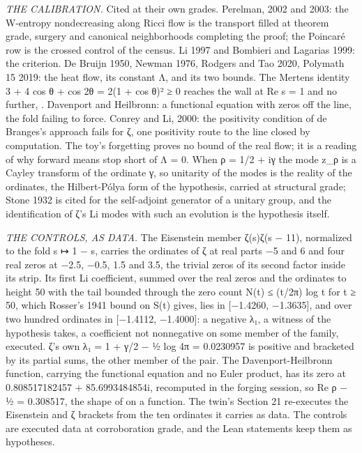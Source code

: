 \documentclass[10pt,twocolumn]{article}
\begin{document}
\emph{THE CALIBRATION.} Cited at their own grades. Perelman, 2002 and
2003: the W-entropy nondecreasing along Ricci flow is the transport
filled at theorem grade, surgery and canonical neighborhoods completing
the proof; the Poincaré row is the crossed control of the census. Li
1997 and Bombieri and Lagarias 1999: the criterion. De Bruijn 1950,
Newman 1976, Rodgers and Tao 2020, Polymath 15 2019: the heat flow, its
constant Λ, and its two bounds. The Mertens identity 3 + 4 cos θ + cos
2θ = 2(1 + cos θ)² ≥ 0 reaches the wall at Re s = 1 and no further,
\texttt{}. Davenport and Heilbronn: a
functional equation with zeros off the line, the fold failing to force.
Conrey and Li, 2000: the positivity condition of de Branges's approach
fails for ζ, one positivity route to the line closed by computation. The
toy's forgetting proves no bound of the real flow; it is a reading of
why forward means stop short of Λ = 0. When ρ = 1/2 + iγ the mode z\_ρ
is a Cayley transform of the ordinate γ, so unitarity of the modes is
the reality of the ordinates, the Hilbert-Pólya form of the hypothesis,
carried at structural grade; Stone 1932 is cited for the self-adjoint
generator of a unitary group, and the identification of ζ's Li modes
with such an evolution is the hypothesis itself.

\emph{THE CONTROLS, AS DATA.} The Eisenstein member ζ(s)ζ(s − 11),
normalized to the fold s ↦ 1 − s, carries the ordinates of ζ at real
parts −5 and 6 and four real zeros at −2.5, −0.5, 1.5 and 3.5, the
trivial zeros of its second factor inside its strip. Its first Li
coefficient, summed over the real zeros and the ordinates to height 50
with the tail bounded through the zero count N(t) ≤ (t/2π) log t for t ≥
50, which Rosser's 1941 bound on S(t) gives, lies in {[}−1.4260,
−1.3635{]}, and over two hundred ordinates in {[}−1.4112, −1.4000{]}: a
negative λ₁, a witness of the hypothesis
\texttt{} takes, a coefficient not
nonnegative on some member of the family, executed. ζ's own λ₁ = 1 + γ/2
− ½ log 4π = 0.0230957 is positive and bracketed by its partial sums,
the other member of the pair. The Davenport-Heilbronn function, carrying
the functional equation and no Euler product, has its zero at
0.808517182457 + 85.6993484854i, recomputed in the forging session, so
Re ρ − ½ = 0.308517, the shape of
\texttt{} on a function. The
twin's Section 21 re-executes the Eisenstein and ζ brackets from the ten
ordinates it carries as data. The controls are executed data at
corroboration grade, and the Lean statements keep them as hypotheses.
\end{document}
